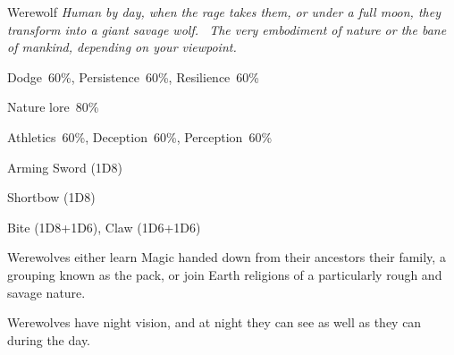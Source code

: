 \begin{monsterbox}{Werewolf}
	\textit{Human by day, when the rage takes them, or under a full moon, they transform into a giant savage wolf.  The very embodiment of nature or the bane of mankind, depending on your viewpoint.}\\
	\rpghline
	\basics[%
        hitpoints  = 12, 
	majorwound = 6,
	damagemodifier = +1D6 (wolf),
	powerpoints = 11,
	movementrate = {15m (man), 30m (wolf)},
	armor = Hide (1AP),
	plunderrating = 0
	]
	\rpghline%
	\stats[ %
		STR = 3D6/6D6  (11/22),
		CON = 3D6      (11),
		DEX = 3D6      (11),
		SIZ = 2D6+6    (13),
		INT = 2D6+6/1D6+3 (13/6),
		POW = 3D6      (11),
		CHA = 3D6      (11)
	]
	\rpghline%
	\begin{rpg-monsteraction}[Resistances]
		Dodge~60\%, Persistence~60\%, Resilience~60\%
	\end{rpg-monsteraction}
	\begin{rpg-monsteraction}[Knowledge]
    		Nature lore~80\%
	\end{rpg-monsteraction}
	\begin{rpg-monsteraction}[Practical]
		Athletics~60\%, Deception~60\%, Perception~60\%
	\end{rpg-monsteraction}
	\begin{rpg-monsteraction}
		Arming Sword (1D8)
	\end{rpg-monsteraction}
	\begin{rpg-monsteraction}
		Shortbow (1D8)
	\end{rpg-monsteraction}
	\begin{rpg-monsteraction}
		Bite (1D8+1D6), Claw (1D6+1D6)
	\end{rpg-monsteraction}
	\begin{rpg-monsteraction}[Magic]
		Werewolves either learn Magic handed down from their ancestors their family, a grouping known as the pack, or join Earth religions of a particularly rough and savage nature.
	\end{rpg-monsteraction}
	\begin{rpg-monsteraction}
		Werewolves have night vision, and at night they can see as well as they can during the day.
	\end{rpg-monsteraction}

\end{monsterbox}
